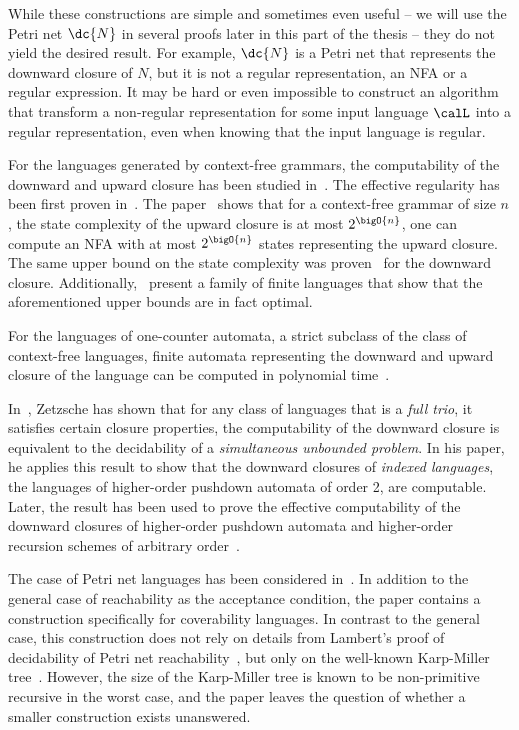 \documentclass[../../diss.tex]{subfiles}
\begin{document}
While these constructions are simple and sometimes even useful -- we will use the Petri net $\dc{N}$ in several proofs later in this part of the thesis --  they do not yield the desired result.
For example, $\dc{N}$ is a Petri net that represents the downward closure of $N$, but it is not a regular representation, \ie an NFA or a regular expression.
It may be hard or even impossible to construct an algorithm that transform a non-regular representation for some input language $\calL$ into a regular representation, even when knowing that the input language is regular.

For the languages generated by context-free grammars, the computability of the downward and upward closure has been studied in~\cite{vanLeeuwen78,Courcelle91,GruberHK07,BachmeierLS15}.
The effective regularity has been first proven in~\cite{vanLeeuwen78}.
The paper~\cite{GruberHK07} shows that for a context-free grammar of size $n$, the state complexity of the upward closure is at most $2^{\bigO{n}}$, \ie one can compute an NFA with at most $2^{\bigO{n}}$ states representing the upward closure.
The same upper bound on the state complexity was proven~\cite{BachmeierLS15} for the downward closure.
Additionally,~\cite{BachmeierLS15} present a family of finite languages that show that the aforementioned upper bounds are in fact optimal.

For the languages of one-counter automata, a strict subclass of the class of context-free languages, finite automata representing the downward and upward closure of the language can be computed in polynomial time~\cite{AtigCHKSZ16}.

In~\cite{Zetzsche15b}, Zetzsche has shown that for any class of languages that is a \emph{full trio}, \ie it satisfies certain closure properties, the computability of the downward closure is equivalent to the decidability of a \emph{simultaneous unbounded problem}.
In his paper, he applies this result to show that the downward closures of \emph{indexed languages}, the languages of higher-order pushdown automata of order 2, are computable.
Later, the result has been used to prove the effective computability of the downward closures of higher-order pushdown automata and higher-order recursion schemes of arbitrary order~\cite{HagueKO16,ClementePSW16}.

The case of Petri net languages has been considered in~\cite{HabermehlMW10}.
In addition to the general case of reachability as the acceptance condition, the paper contains a construction specifically for coverability languages.
In contrast to the general case, this construction does not rely on details from Lambert's proof of decidability of Petri net reachability~\cite{Lambert92}, but only on the well-known Karp-Miller tree~\cite{KarpM69}.
However, the size of the Karp-Miller tree is known to be non-primitive recursive in the worst case, and the paper leaves the question of whether a smaller construction exists unanswered.
\end{document}
